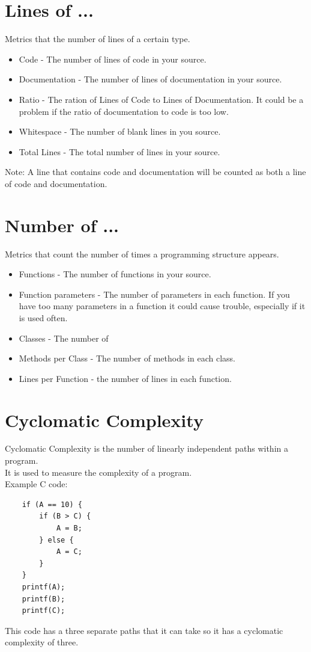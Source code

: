 \documentclass{scrreprt}
\begin{document}
	\section{Lines of ...}
	Metrics that the number of lines of a certain type.
	\begin{itemize}
		\item Code - The number of lines of code in your source.
		\item Documentation - The number of lines of documentation in your source.
		\item Ratio - The ration of Lines of Code to Lines of Documentation. It could be a problem if the ratio of documentation to code is too low.
		\item Whitespace - The number of blank lines in you source.
		\item Total Lines - The total number of lines in your source.
	\end{itemize}
	Note: A line that contains code and documentation will be counted as both a line of code and documentation.
	
	\section{Number of ...}
	Metrics that count the number of times a programming structure appears.
	\begin{itemize}
		\item Functions - The number of functions in your source.
		\item Function parameters - The number of parameters in each function. If you have too many parameters in a function it could cause trouble, especially if it is used often.
		\item Classes - The number of 
		\item Methods per Class - The number of methods in each class.
		\item Lines per Function - the number of lines in each function.
	\end{itemize}
	
	\section{Cyclomatic Complexity}
	Cyclomatic Complexity is the number of linearly independent paths within a program. \\
	It is used to measure the complexity of a program. \\
	
	Example C code:
	\begin{lstlisting}
	if (A == 10) {
	    if (B > C) {
	        A = B;
	    } else {
	        A = C;
	    }
	}
	printf(A);
	printf(B);
	printf(C);
	\end{lstlisting}
	This code has a three  separate paths that it can take so it has a cyclomatic complexity of three. 
\end{document}
